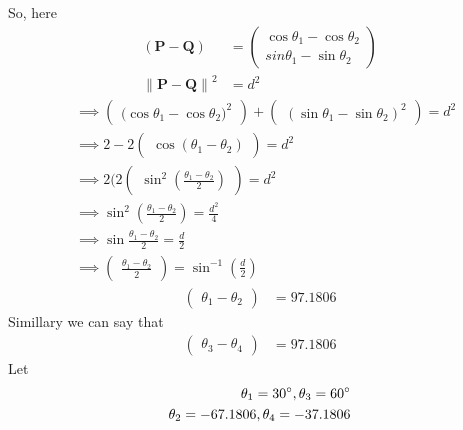 \documentclass[jornel,10pt,twocolumn]{article}
\providecommand{\norm}[1]{\left\lVert#1\right\rVert}
\newcommand{\myvec}[1]{\ensuremath{\begin{pmatrix}#1\end{pmatrix}}}
\let\vec\mathbf
\begin{document}
So, here
\begin{align}
	(\vec{P}-\vec{Q})&=\myvec{{\cos\theta_1}-{\cos\theta_2}\\{sin\theta_1}-{\sin\theta_2}}\\
	\norm{\vec{P}-\vec{Q}}^2&=d^2
		\end{align}
		\begin{align*}
	&\implies\myvec{({\cos\theta_1}-{\cos\theta_2)}^2}+\myvec{({\sin\theta_1}-{\sin\theta_2})^2}=d^2\\
	&\implies2-2\myvec{\cos(\theta_1-\theta_2)}=d^2\\
	&\implies2(2\myvec{{\sin^2}(\frac{{\theta_1}-{\theta_2}}{2})}=d^2\\
	&\implies{\sin^2}(\frac{{\theta_1}-{\theta_2}}{2})=\frac{d^2}{4}\\
	&\implies\sin\frac{{\theta_1}-{\theta_2}}{2}=\frac{d}{2}\\
&\implies\myvec{\frac{{\theta_1}-{\theta_2}}{2}}=\sin^{-1}(\frac{d}{2})
	\end{align*}
\begin{align}
	\myvec{{\theta_1}-{\theta_2}}&=97.1806
	\end{align}
Simillary we can say that
\begin{align}
	\myvec{{\theta_3}-{\theta_4}}&=97.1806 		       
\end{align}	
Let
\begin{align}
{\theta_1=30\degree},{\theta_3=60\degree}\\
{\theta_2=-67.1806},{\theta_4=-37.1806}
\end{align}
\end{document}
